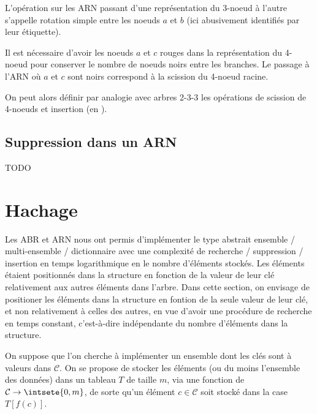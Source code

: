 \documentclass{scrartcl}
\begin{document}
			\rem L'opération sur les ARN passant d'une représentation du 3-noeud à l'autre s'appelle rotation simple entre les noeuds $a$ et $b$ (ici abusivement identifiés par leur étiquette).

			\rem Il est nécessaire d'avoir les noeuds $a$ et $c$ rouges dans la représentation du 4-noeud pour conserver le nombre de noeuds noirs entre les branches.
				Le passage à l'ARN où $a$ et $c$ sont noirs correspond à la scission du 4-noeud racine.

			On peut alors définir par analogie avec arbres 2-3-3 les opérations de scission de 4-noeuds et insertion (en \exercice).

		\subsection{Suppression dans un ARN}
			TODO

	\section{Hachage}
		Les ABR et ARN nous ont permis d'implémenter le type abstrait ensemble / multi-ensemble / dictionnaire avec une complexité de recherche / suppression / insertion en temps logarithmique en le nombre d'éléments stockés. Les éléments étaient positionnés dans la structure en fonction de la valeur de leur clé relativement aux autres éléments dans l'arbre. Dans cette section, on envisage de positioner les éléments dans la structure en fontion de la seule valeur de leur clé, et non relativement à celles des autres, en vue d'avoir une procédure de recherche en temps constant, c'est-à-dire indépendante du nombre d'éléments dans la structure.

		On suppose que l'on cherche à implémenter un ensemble dont les clés sont à valeurs dans $\mathcal{C}$. On se propose de stocker les éléments (ou du moins l'ensemble des données) dans un tableau $T$ de taille $m$, via une fonction de $\mathcal{C} \rightarrow \intsete{0,m}$, de sorte qu'un élément $c \in \mathcal{C}$ soit stocké dans la case $T[f(c)]$.
\end{document}
